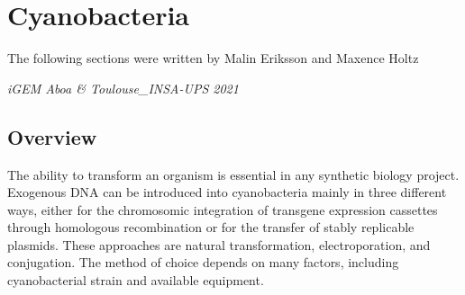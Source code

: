 \section{Cyanobacteria}
\epigraph{The following sections were written by Malin Eriksson and Maxence Holtz}{\textit{iGEM Aboa \& Toulouse\_INSA-UPS 2021}}
\subsection{Overview}
The ability to transform an organism is essential in any synthetic biology project. Exogenous DNA can be introduced into cyanobacteria mainly in three different ways, either for the chromosomic integration of transgene expression cassettes through homologous recombination or for the transfer of stably replicable plasmids. These approaches are natural transformation, electroporation, and conjugation. The method of choice depends on many factors, including cyanobacterial strain and available equipment.

